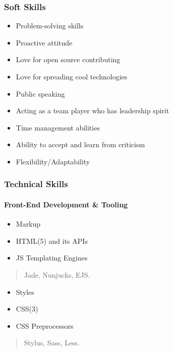 \documentclass[]{article}
\providecommand{\tightlist}{%
  \setlength{\itemsep}{0pt}\setlength{\parskip}{0pt}}
\let\oldparagraph\paragraph
\renewcommand{\paragraph}[1]{\oldparagraph{#1}\mbox{}}
\begin{document}
\subsubsection{Soft Skills}\label{soft-skills}

\begin{itemize}
\tightlist
\item
  Problem-solving skills
\item
  Proactive attitude
\item
  Love for open source contributing
\item
  Love for spreading cool technologies
\item
  Public speaking
\item
  Acting as a team player who has leadership spirit
\item
  Time management abilities
\item
  Ability to accept and learn from criticism
\item
  Flexibility/Adaptability
\end{itemize}

\subsubsection{Technical Skills}\label{technical-skills}

\paragraph{Front-End Development \&
Tooling}\label{front-end-development-tooling}

\begin{itemize}
\item
  Markup
\item
  HTML(5) and its APIs
\item
  JS Templating Engines
\end{itemize}

\begin{quote}
Jade, Nunjucks, EJS.
\end{quote}

\begin{itemize}
\item
  Styles
\item
  CSS(3)
\item
  CSS Preprocessors
\end{itemize}

\begin{quote}
Stylus, Sass, Less.
\end{quote}
\end{document}
